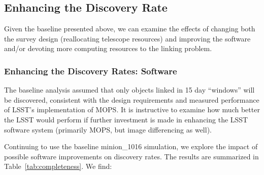 \subsection{Enhancing the Discovery Rate}

Given the baseline presented above, we can examine the effects of changing both the survey design (reallocating telescope resources) and improving the software and/or devoting more computing resources to the linking problem.


\subsubsection{Enhancing the Discovery Rates: Software}

The baseline analysis assumed that only objects linked in 15 day ``windows'' will be discovered, consistent with the design requirements and measured performance of LSST's implementation of MOPS. It is instructive to examine how much better the LSST would perform if further investment is made in enhancing the LSST software system (primarily MOPS, but image differencing as well).

Continuing to use the baseline minion\_1016 simulation, we explore the impact of possible software improvements on discovery rates. The results are summarized in Table~\ref{tab:completeness}. We find:

